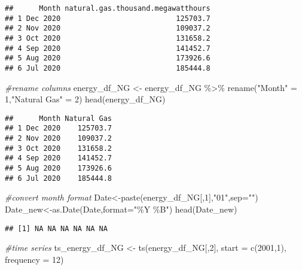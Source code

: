 \documentclass[
]{article}
\newenvironment{Shaded}{\begin{snugshade}}{\end{snugshade}}
\newcommand{\AttributeTok}[1]{\textcolor[rgb]{0.77,0.63,0.00}{#1}}
\newcommand{\CommentTok}[1]{\textcolor[rgb]{0.56,0.35,0.01}{\textit{#1}}}
\newcommand{\DecValTok}[1]{\textcolor[rgb]{0.00,0.00,0.81}{#1}}
\newcommand{\FunctionTok}[1]{\textcolor[rgb]{0.00,0.00,0.00}{#1}}
\newcommand{\NormalTok}[1]{#1}
\newcommand{\OtherTok}[1]{\textcolor[rgb]{0.56,0.35,0.01}{#1}}
\newcommand{\SpecialCharTok}[1]{\textcolor[rgb]{0.00,0.00,0.00}{#1}}
\newcommand{\StringTok}[1]{\textcolor[rgb]{0.31,0.60,0.02}{#1}}
\begin{document}
\begin{verbatim}
##      Month natural.gas.thousand.megawatthours
## 1 Dec 2020                           125703.7
## 2 Nov 2020                           109037.2
## 3 Oct 2020                           131658.2
## 4 Sep 2020                           141452.7
## 5 Aug 2020                           173926.6
## 6 Jul 2020                           185444.8
\end{verbatim}

\begin{Shaded}
\begin{Highlighting}[]
\CommentTok{\#rename columns}
\NormalTok{energy\_df\_NG }\OtherTok{\textless{}{-}}\NormalTok{ energy\_df\_NG }\SpecialCharTok{\%\textgreater{}\%}
  \FunctionTok{rename}\NormalTok{(}\StringTok{"Month"} \OtherTok{=} \DecValTok{1}\NormalTok{,}\StringTok{"Natural Gas"} \OtherTok{=} \DecValTok{2}\NormalTok{)}
\FunctionTok{head}\NormalTok{(energy\_df\_NG)}
\end{Highlighting}
\end{Shaded}

\begin{verbatim}
##      Month Natural Gas
## 1 Dec 2020    125703.7
## 2 Nov 2020    109037.2
## 3 Oct 2020    131658.2
## 4 Sep 2020    141452.7
## 5 Aug 2020    173926.6
## 6 Jul 2020    185444.8
\end{verbatim}

\begin{Shaded}
\begin{Highlighting}[]
\CommentTok{\#convert month format}
\NormalTok{Date}\OtherTok{\textless{}{-}}\FunctionTok{paste}\NormalTok{(energy\_df\_NG[,}\DecValTok{1}\NormalTok{],}\StringTok{"01"}\NormalTok{,}\AttributeTok{sep=}\StringTok{""}\NormalTok{)}
\NormalTok{Date\_new}\OtherTok{\textless{}{-}}\FunctionTok{as.Date}\NormalTok{(Date,}\AttributeTok{format=}\StringTok{"\%Y \%B"}\NormalTok{)}
\FunctionTok{head}\NormalTok{(Date\_new)}
\end{Highlighting}
\end{Shaded}

\begin{verbatim}
## [1] NA NA NA NA NA NA
\end{verbatim}

\begin{Shaded}
\begin{Highlighting}[]
\CommentTok{\#time series}
\NormalTok{ts\_energy\_df\_NG }\OtherTok{\textless{}{-}} \FunctionTok{ts}\NormalTok{(energy\_df\_NG[,}\DecValTok{2}\NormalTok{], }\AttributeTok{start =} \FunctionTok{c}\NormalTok{(}\DecValTok{2001}\NormalTok{,}\DecValTok{1}\NormalTok{), }\AttributeTok{frequency =} \DecValTok{12}\NormalTok{)}
\end{Highlighting}
\end{Shaded}
\end{document}

